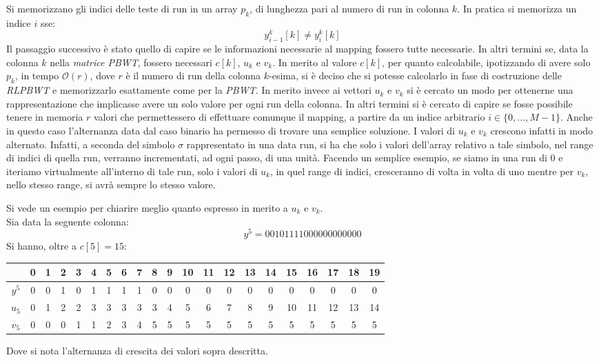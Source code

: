 Si memorizzano gli indici delle teste di run in un array $p_k$, di lunghezza
pari al numero di run in colonna $k$. In pratica si memorizza un indice $i$ sse:
\begin{equation}
  \label{eq:naive1}
  y_{i-1}^k[k]\neq y_i^k[k]
\end{equation}
Il passaggio successivo è stato quello di capire se le informazioni necessarie
al mapping fossero tutte necessarie. In altri termini se, data la colonna $k$
nella \textit{matrice PBWT}, fossero necessari $c[k]$, $u_k$ e $v_k$. In merito
al valore $c[k]$, per quanto calcolabile, ipotizzando di avere solo $p_k$, in
tempo $\mathcal{O}(r)$, dove $r$ è 
il numero di run della colonna $k$-esima, si è deciso che si potesse calcolarlo
in fase di costruzione delle \textit{RLPBWT} e memorizzarlo esattamente come per
la \textit{PBWT}. In merito invece ai vettori $u_k$ e $v_k$ si è cercato un modo
per ottenerne una rappresentazione che implicasse avere un solo valore per ogni
run della colonna. In altri termini si è cercato di capire se fosse possibile
tenere in memoria $r$ valori che permettessero di effettuare comunque il
mapping, a partire da un indice arbitrario $i\in\{0,\ldots,M-1\}$. Anche in
questo caso l'alternanza data dal caso binario ha permesso di trovare una
semplice soluzione. I valori di $u_k$ e $v_k$ crescono infatti in modo
alternato. Infatti, a seconda del simbolo $\sigma$ rappresentato in una data
run, si ha che solo i valori dell'array relativo a tale simbolo, nel range di
indici di quella run, verranno incrementati, ad ogni passo, di una
unità. Facendo un semplice esempio, se siamo in una run di 0 e iteriamo
virtualmente all'interno di tale run, solo i valori di $u_k$, in quel
range di indici, cresceranno di volta in volta di uno mentre per $v_k$, nello
stesso range, si avrà sempre lo stesso valore.
\begin{esempio}
  Si vede un esempio per chiarire meglio quanto espresso in merito a $u_k$ e
  $v_k$.\\
  Sia data la seguente colonna:
  \[y^5=00101111000000000000\]
  Si hanno, oltre a $c[5]=15$:
  \begin{table}[H]
    \footnotesize
    \centering
    \begin{tabular}{c||cc|c|c|cccc|cccccccccccc}
      & 0 & 1 & 2 & 3 & 4 & 5 & 6 & 7 & 8 & 9 & 10 & 11 & 12 & 13 & 14 & 15 & 16
      & 17 & 18 & 19\\
      \hline
      \hline
      $y^5$ & 0 & 0 & 1 & 0 & 1 & 1 & 1 & 1 & 0 & 0 & 0 & 0 & 0 & 0 & 0 & 0 & 0
      & 0 & 0 & 0\\
      \hline
      \hline
      $u_5$ & 0 & 1 & 2 & 2 & 3 & 3 & 3 & 3 & 3 & 4 & 5 & 6 & 7 & 8 & 9 & 10
      & 11 & 12 & 13 & 14\\
      \hline
      $v_5$ & 0 & 0 & 0 & 1 & 1 & 2 & 3 & 4 & 5 & 5 & 5 & 5 & 5 & 5 & 5 & 5 & 5
      & 5 & 5 & 5
    \end{tabular}
  \end{table}
  Dove si nota l'alternanza di crescita dei valori sopra descritta.
\end{esempio}
